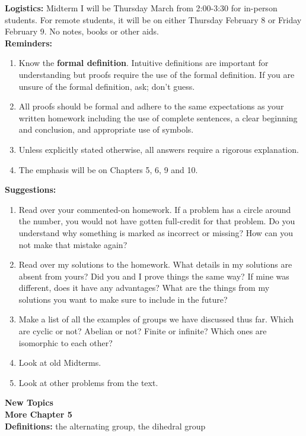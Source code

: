 \documentclass[12pt]{article}
\begin{document}
\textbf{Logistics:} Midterm I will be Thursday March from 2:00-3:30 for in-person students. For remote students, it will be on either Thursday February 8 or Friday February 9. No notes, books or other aids.\\

\textbf{Reminders:}
\begin{enumerate}
	\item Know the \textbf{formal definition}. Intuitive definitions are important for understanding but proofs require the use of the formal definition. If you are unsure of the formal definition, ask; don't guess.
	\item All proofs should be formal and adhere to the same expectations as your written homework including the use of complete sentences, a clear beginning and conclusion, and appropriate use of symbols.
	\item Unless explicitly stated otherwise, all answers require a rigorous explanation.
	\item The emphasis will be on Chapters 5, 6, 9 and 10.
\end{enumerate}

\textbf{Suggestions:}
\begin{enumerate}
	\item Read over your commented-on homework. If a problem has a circle around the number, you would not have gotten full-credit for that problem. Do you understand why something is marked as incorrect or missing? How can you not make that mistake again?
	\item Read over my solutions to the homework. What details in my solutions are absent from yours? Did you and I prove things the same way? If mine was different, does it have any advantages? What are the things from my solutions you want to make sure to include in the future?
	\item Make a list of all the examples of groups we have discussed thus far. Which are cyclic or not? Abelian or not? Finite or infinite? Which ones are isomorphic to each other?
	\item Look at old Midterms.
	\item Look at other problems from the text.
\end{enumerate}

\textbf{New Topics}\\

\noindent \textbf{More Chapter 5}\\

\noindent \textbf{Definitions:} the alternating group, the dihedral group
\end{document}
